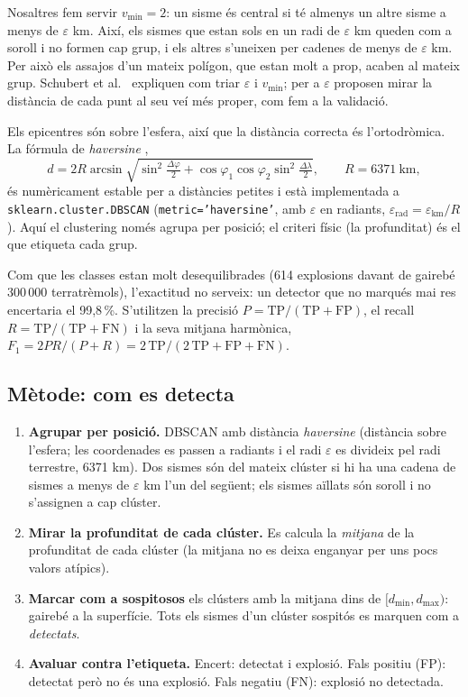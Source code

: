 \documentclass[a4paper,11pt]{article}
\begin{document}
Nosaltres fem servir $v_{\min}=2$: un sisme és central si té almenys un altre sisme a menys de $\varepsilon$ km. Així, els sismes
que estan sols en un radi de $\varepsilon$ km queden com a soroll i no formen cap grup, i els altres s'uneixen per cadenes de
menys de $\varepsilon$ km. Per això els assajos d'un mateix polígon, que estan molt a prop, acaben al mateix grup. Schubert et
al.\ \cite{schubert2017} expliquen com triar $\varepsilon$ i $v_{\min}$; per a $\varepsilon$ proposen mirar la distància de cada
punt al seu veí més proper, com fem a la validació.

Els epicentres són sobre l'esfera, així que la distància correcta és l'ortodròmica. La fórmula de \emph{haversine}
\cite{sinnott1984},
\[
d = 2R\arcsin\sqrt{\sin^2\!\tfrac{\Delta\varphi}{2}+\cos\varphi_1\cos\varphi_2\sin^2\!\tfrac{\Delta\lambda}{2}},\qquad R=6371\ \text{km},
\]
és numèricament estable per a distàncies petites i està implementada a \texttt{sklearn.cluster.DBSCAN}
\cite{pedregosa2011} (\texttt{metric='haversine'}, amb $\varepsilon$ en radiants, $\varepsilon_{\mathrm{rad}}=\varepsilon_{\mathrm{km}}/R$).
Aquí el clustering només agrupa per posició; el criteri físic (la profunditat) és el que etiqueta cada grup.

Com que les classes estan molt desequilibrades (614 explosions davant de gairebé 300\,000 terratrèmols), l'exactitud no serveix:
un detector que no marqués mai res encertaria el 99,8\,\%. S'utilitzen la precisió $P=\mathrm{TP}/(\mathrm{TP}+\mathrm{FP})$, el
recall $R=\mathrm{TP}/(\mathrm{TP}+\mathrm{FN})$ i la seva mitjana harmònica, $F_1=2PR/(P+R)=2\,\mathrm{TP}/(2\,\mathrm{TP}+\mathrm{FP}+\mathrm{FN})$.

\subsection{Mètode: com es detecta}
\begin{enumerate}
  \item \textbf{Agrupar per posició.} DBSCAN amb distància \emph{haversine} (distància sobre l'esfera; les coordenades es
        passen a radiants i el radi $\varepsilon$ es divideix pel radi terrestre, 6371 km). Dos sismes són del mateix clúster
        si hi ha una cadena de sismes a menys de $\varepsilon$ km l'un del següent; els sismes aïllats són soroll i no
        s'assignen a cap clúster.
  \item \textbf{Mirar la profunditat de cada clúster.} Es calcula la \emph{mitjana} de la profunditat de cada clúster (la
        mitjana no es deixa enganyar per uns pocs valors atípics).
  \item \textbf{Marcar com a sospitosos} els clústers amb la mitjana dins de $[d_{\min}, d_{\max})$: gairebé a la superfície.
        Tots els sismes d'un clúster sospitós es marquen com a \emph{detectats}.
  \item \textbf{Avaluar contra l'etiqueta.} Encert: detectat i explosió. Fals positiu (FP): detectat però no és una explosió.
        Fals negatiu (FN): explosió no detectada.
\end{enumerate}
\end{document}
